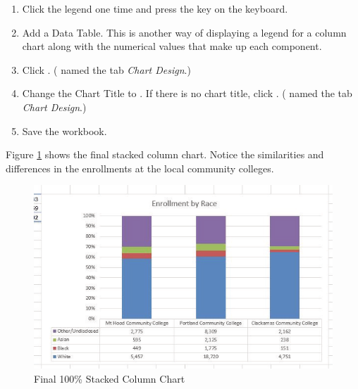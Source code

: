 \begin{enumbox}
\begin{enumerate}
		\item Click the legend one time and press the  key on the keyboard.
		\item Add a Data Table. This is another way of displaying a legend for a column chart along with the numerical values that make up each component.
		\item Click . ( named the tab \textit{Chart Design}.)
		\item Change the Chart Title to . If there is no chart title, click . ( named the tab \textit{Chart Design}.)
		\item Save the  workbook.
	\end{enumerate}
\end{enumbox}
	
Figure \ref{04:fig27} shows the final stacked column chart. Notice the similarities and differences in the enrollments at the local community colleges.

\begin{figure}[H]
	\centering
	\includegraphics[width=\maxwidth{.95\linewidth}]{gfx/ch04_fig27}
	\caption{Final 100\% Stacked Column Chart}
	\label{04:fig27}
\end{figure}

